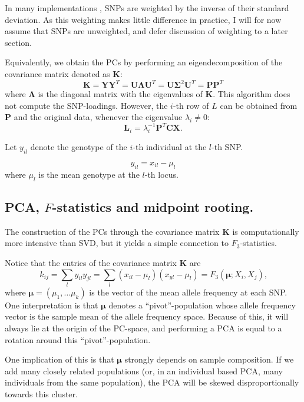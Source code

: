 \documentclass[10pt,a4paper]{article}
\newcommand{\MX}{\mathbf{X}} %
\newcommand{\MC}{\mathbf{C}} %
\newcommand{\MY}{\mathbf{Y}} %
\newcommand{\MP}{\mathbf{P}} %
\newcommand{\ML}{\mathbf{L}} %
\newcommand{\MK}{\mathbf{K}} %
\newcommand{\MSINGULAR}{\mathbf{\Sigma}} %
\newcommand{\MEIGEN}{\mathbf{\Lambda}} %
\newcommand{\MEAN}{\boldsymbol{\mu}} %
\begin{document}
	In many  implementations \citep[e.g]{patterson2006}, SNPs are weighted by the inverse of their standard deviation. As this weighting makes little difference in practice, I will for now assume that SNPs are unweighted, and defer discussion of weighting to a later section.
	
	Equivalently, we obtain the PCs by performing an eigendecomposition of the  covariance matrix denoted as $\MK$:
	 \begin{equation}
 \MK = \MY \MY^T = \mathbf{U}\MEIGEN\mathbf{U}^T = \mathbf{U}\MSINGULAR^2\mathbf{U}^T =\MP\MP^T
	\end{equation} where $\MEIGEN$ is the diagonal matrix with the eigenvalues of $\MK$. 
	This algorithm does not compute the SNP-loadings. However, the $i$-th row of $L$  can be obtained from $\MP$ and the original data, whenever the eigenvalue $\lambda_i \neq 0$:
	\begin{equation}
	\ML_i = \lambda_i^{-1}\MP^T\MC\MX \text{.}
	\end{equation}
	
	
	Let $y_{il}$ denote the genotype of the $i$-th individual at the $l$-th SNP.
	
	\begin{equation}
	y_{il} = x_{il} - \mu_l
	\end{equation}
	where $\mu_l$ is the mean genotype at the $l$-th locus.
	
	
	\subsection{PCA, $F$-statistics and midpoint rooting.}
    The construction of the PCs through the covariance matrix $\MK$ is computationally more intensive than SVD, but it yields a simple connection to $F_3$-statistics.

	Notice that the entries of the covariance matrix $\MK$ are
	\begin{equation}
	k_{ij} = \sum_l y_{il} y_{jl} = \sum_l (x_{il} - \mu_l)(x_{yl} - \mu_l) = F_3(\MEAN; X_i, X_j)\text{,}
	\end{equation}
	where $\MEAN = (\mu_1, \dots \mu_k)$ is the vector of the mean allele frequency at each SNP. One interpretation is that $\MEAN$ denotes a ``pivot''-population whose allele frequency vector is the sample mean of the allele frequency space. Because of this, it will always lie at the origin of the PC-space, and performing a PCA is equal to a rotation around this ``pivot''-population.
	
	One implication of this is that $\MEAN$ strongly depends on sample composition. If we add many closely related populations (or, in an individual based PCA, many individuals from the same population), the PCA will be skewed disproportionally towards this cluster. 
	
\end{document}
